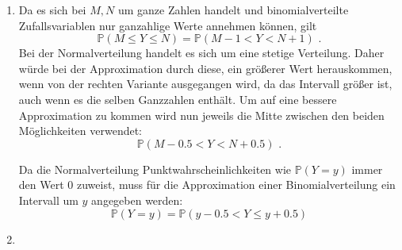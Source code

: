 \documentclass[a4paper]{scrartcl}
\newcommand{\prob}{\mathbb{P}}
\def \blattnr {5}
\begin{document}
\begin{enumerate}[label=\bfseries \blattnr.\arabic*]
\begin{enumerate}
	      
            \item
                Da es sich bei $M,N$ um ganze Zahlen handelt und
                binomialverteilte Zufallsvariablen nur ganzahlige Werte
                annehmen können, gilt
                \begin{equation*}
                    \prob(M \leq Y \leq N) = \prob(M-1 < Y < N+1)
                    \text{ .}
                \end{equation*}
                Bei der Normalverteilung handelt es sich um eine stetige
                Verteilung. Daher würde bei der Approximation durch diese, ein
                größerer Wert herauskommen, wenn von der rechten Variante
                ausgegangen wird, da das Intervall größer ist, auch wenn es die
                selben Ganzzahlen enthält.  Um auf eine bessere Approximation
                zu kommen wird nun jeweils die Mitte zwischen den beiden
                Möglichkeiten verwendet:
                \begin{equation*}
                    \prob(M-\num{0,5} < Y < N+\num{0,5})
                    \text{ .}
                \end{equation*}

                Da die Normalverteilung Punktwahrscheinlichkeiten wie
                $\prob(Y=y)$ immer den Wert $0$ zuweist, muss für die
                Approximation einer Binomialverteilung ein Intervall um $y$
                angegeben werden:
                \begin{equation*}
                    \prob(Y=y) = \prob(y-\num{0,5} < Y \leq y+\num{0,5})
                \end{equation*}

            \item \hfill \\
                
                

        \end{enumerate}
   
\end{enumerate}
\end{document}
